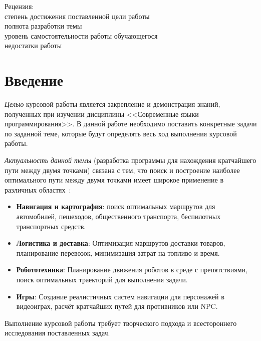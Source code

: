 \documentclass[12pt,chapterprefix=true,headings=onelineappendix]{scrartcl}
\begin{document}
\begin{titlepage}
	\vfill
	\begin{flushleft}
		Рецензия:  \\
		степень достижения поставленной цели работы \hrulefill{} \\
		полнота разработки темы \hrulefill{ } \\
		уровень самостоятельности работы обучающегося \hrulefill{} \\
		недостатки работы \hrulefill{}\\
	\end{flushleft}

\end{titlepage}

\tableofcontents

\newpage{}
\section*{Введение}

\emph{Целью} курсовой работы является закрепление и демонстрация знаний,
полученных при изучении дисциплины <<Современные языки программирования>>. В
данной работе необходимо поставить конкретные задачи по заданной теме, которые
будут определять весь ход выполнения курсовой работы.

\emph{Актуальность данной темы} (разработка программы для нахождения
кратчайшего пути между двумя точками) связана с тем, что поиск и построение
наиболее оптимального пути между двумя точками имеет широкое применение в
различных областях~\cite{Sokolov-graph_in_logistic,
	Vardomatskaya-optimization_with_graphs, Брюске1998-графыАлгоритмов}:
\begin{itemize}
	\item \textbf{Навигация и картография}: поиск оптимальных маршрутов для
	      автомобилей, пешеходов, общественного транспорта, беспилотных транспортных
	      средств.
	\item \textbf{Логистика и доставка}: Оптимизация маршрутов доставки товаров,
	      планирование перевозок, минимизация затрат на топливо и время.
	\item \textbf{Робототехника}: Планирование движения роботов в среде с
	      препятствиями, поиск оптимальных траекторий для выполнения задачи.
	\item \textbf{Игры}: Создание реалистичных систем навигации для персонажей в
	      видеоиграх, расчёт кратчайших путей для противников или NPC.
\end{itemize}

Выполнение курсовой работы требует творческого подхода и всестороннего
исследования поставленных задач.
\end{document}

